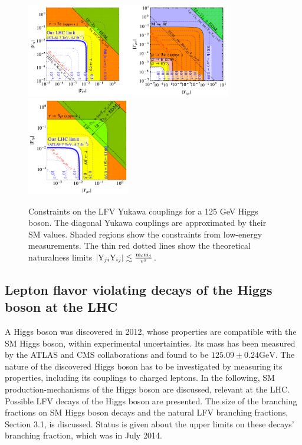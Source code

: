\begin{figure}[htbp]
  \centering
  \includegraphics[width=0.8\textwidth]{plots/chapter2/Ymt.png} \\
  \includegraphics[width=0.4\textwidth]{plots/chapter2/Yem.png}
  \caption{Constraints on the LFV Yukawa couplings for a 125 GeV Higgs boson. The diagonal Yukawa couplings are approximated by their SM values. Shaded regions show the constraints from low-energy measurements. The thin red dotted lines show the theoretical naturalness limits $|\text{Y}_{ji} \text{Y}_{ij}| \lesssim \frac{\mathrm{m}_{i} \mathrm{m}_{j}}{\mathrm{v}^2}$.}
  \label{fig:yuk}
\end{figure}

\subsection{Lepton flavor violating decays of the Higgs boson at the LHC}
A Higgs boson was discovered in 2012, whose properties are compatible with the SM Higgs boson, within experimental uncertainties. Its mass has been measured by the ATLAS and CMS collaborations and found to be $125.09 \pm 0.24 \mathrm{GeV}$. The nature of the discovered Higgs boson has to be investigated by measuring its properties, including its couplings to charged leptons. In the following, SM production-mechanisms of the Higgs boson are discussed, relevant at the LHC. Possible LFV decays of the Higgs boson are presented. The size of the branching fractions on SM Higgs boson decays and the natural LFV branching fractions, Section 3.1, is discussed. Status is given about the upper limits on these decays' branching fraction, which was in July 2014.

